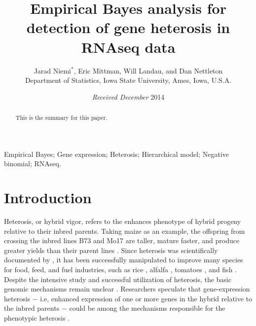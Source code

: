 \documentclass[useAMS,usenatbib,referee]{biom}
\title{Empirical Bayes analysis for detection of gene heterosis in RNAseq data}
\author{Jarad Niemi$^*$\email{niemi@iastate.edu}, 
Eric Mittman, 
Will Landau, and 
Dan Nettleton \\
Department of Statistics, Iowa State University, Ames, Iowa, U.S.A.}
\begin{document}
\date{{\it Received December} 2014} 

\pagerange{\pageref{firstpage}--\pageref{lastpage}} 

\label{firstpage}


\begin{abstract}
This is the summary for this paper.
\end{abstract}

\begin{keywords}
Empirical Bayes; Gene expression; Heterosis; Hierarchical model; Negative binomial; RNAseq.
\end{keywords}

\maketitle


\section{Introduction}
\label{s:intro}

Heterosis, or hybrid vigor, refers to the enhances phenotype of hybrid progeny relative to their inbred parents. Taking maize as an example, the offspring from crossing the inbred lines B73 and Mo17 are taller, mature faster, and produce greater yields than their parent lines \citep{hallauer1981quantitative, hallauer2010quantitative}. Since heterosis was scientifically documented by \cite{darwin1876effects}, it has been successfully manipulated to improve many species for food, feed, and fuel industries, such as rice \citep{yu1997importance}, alfalfa \citep{riday2002heterosis}, tomatoes \citep{krieger2010flowering}, and fish \citep{wohlfarth1993heterosis}. Despite the intensive study and successful utilization of heterosis, the basic genomic mechanisms remain unclear \citep{coors1999genetics, lippman2007heterosis}. Researchers speculate that gene-expression heterosis $-$ i.e, enhanced expression of one or more genes in the hybrid relative to the inbred parents $-$ could be among the mechanisms responsible for the phenotypic heterosis \citep{swanson2006all, springer2007allelic}.

\end{document}
